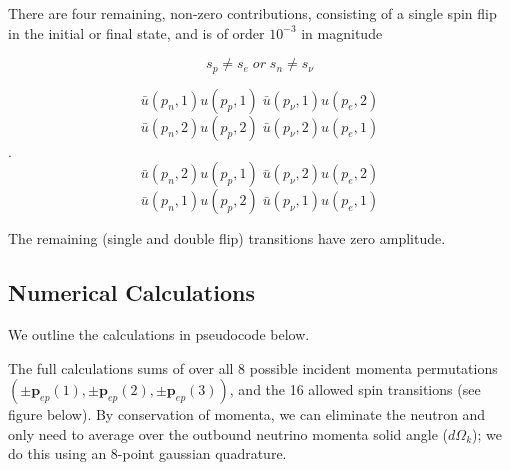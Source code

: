 \documentclass[%
 aip,
 jmp,%
 amsmath,amssymb,
 reprint,%
]{revtex4-1}
\begin{document}
There are four remaining, non-zero contributions, consisting of a single spin flip
in the initial or final state, and is of order $10^{-3}$ in magnitude

$$s_{p}\neq s{_e}\;{or}\;s_{n}\neq s_{\nu}$$

$$\bar{u}(p_{n},1)u(p_{p},1)\;\bar{u}(p_{\nu},1)u(p_{e},2)$$
$$\bar{u}(p_{n},2)u(p_{p},2)\;\bar{u}(p_{\nu},2)u(p_{e},1)$$.
$$\bar{u}(p_{n},2)u(p_{p},1)\;\bar{u}(p_{\nu},2)u(p_{e},2)$$
$$\bar{u}(p_{n},1)u(p_{p},2)\;\bar{u}(p_{\nu},1)u(p_{e},1)$$


The remaining (single and double flip) transitions have zero amplitude.

\subsection{Numerical Calculations}

We outline the calculations in pseudocode below.  

The full calculations sums of over all 8 possible incident momenta permutations
  $(\pm\mathbf{p}_{ep}(1),\pm\mathbf{p}_{ep}(2),\pm\mathbf{p}_{ep}(3) )$,
and the 16 allowed spin transitions (see figure below). By conservation of momenta, we can eliminate the neutron and only need to average over the outbound neutrino momenta solid angle ($d\Omega_k$); we do this using an 8-point gaussian quadrature. 
\end{document}
